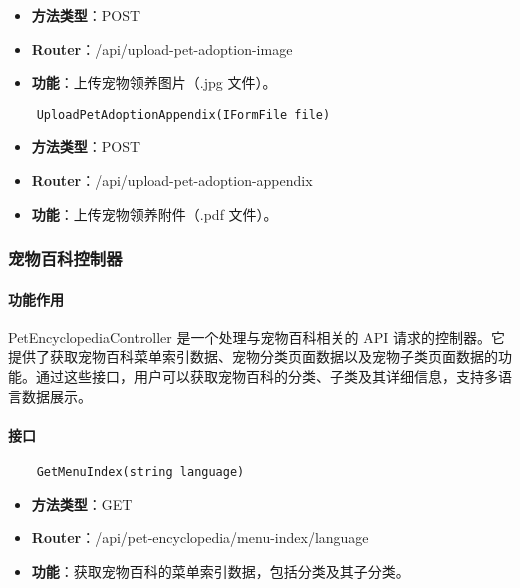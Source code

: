 \begin{itemize}
	\item \textbf{方法类型}：POST
	\item \textbf{Router}：/api/upload-pet-adoption-image
	\item \textbf{功能}：上传宠物领养图片（.jpg 文件）。
\end{itemize}

\begin{verbatim}
	UploadPetAdoptionAppendix(IFormFile file)
\end{verbatim}

\begin{itemize}
	\item \textbf{方法类型}：POST
	\item \textbf{Router}：/api/upload-pet-adoption-appendix
	\item \textbf{功能}：上传宠物领养附件（.pdf 文件）。
\end{itemize}

\subsubsection{宠物百科控制器}

\paragraph{功能作用}

PetEncyclopediaController 是一个处理与宠物百科相关的 API 请求的控制器。它提供了获取宠物百科菜单索引数据、宠物分类页面数据以及宠物子类页面数据的功能。通过这些接口，用户可以获取宠物百科的分类、子类及其详细信息，支持多语言数据展示。

\paragraph{接口}

\begin{verbatim}
	GetMenuIndex(string language)
\end{verbatim}

\begin{itemize}
	\item \textbf{方法类型}：GET
	\item \textbf{Router}：/api/pet-encyclopedia/menu-index/{language}
	\item \textbf{功能}：获取宠物百科的菜单索引数据，包括分类及其子分类。
\end{itemize}

